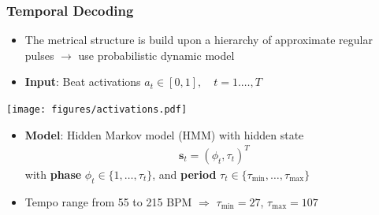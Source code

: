 \documentclass{beamer}
\begin{document}
\begin{frame}
\frametitle{Temporal Decoding}

\begin{itemize}
\item The metrical structure is build upon a hierarchy of approximate regular pulses $\rightarrow$ use probabilistic dynamic model 
\item \textbf{Input}: Beat activations $a_t \in [0,1], \quad t = 1.\dots, T$
\end{itemize}

\begin{minipage}{\textwidth} 
\centering
\texttt{[image: figures/activations.pdf]}
\end{minipage}

\begin{itemize}
\item \textbf{Model}: Hidden Markov model (HMM) with hidden state
\begin{align}
\mathbf s_t = (\phi_t, \tau_t)^T
\end{align} 
with \textbf{phase} $\phi_t \in \{1, \dots, \tau_t\}$, and \textbf{period} $\tau_t \in \{ \tau_{\text{min}}, \dots, \tau_{\text{max}}\}$

\vspace{0.5em}
\item Tempo range from 55 to 215 BPM $\Rightarrow$  $\tau_\text{min} = 27$,  $\tau_\text{max} = 107$ 
\end{itemize}
\end{frame}




\end{document}

